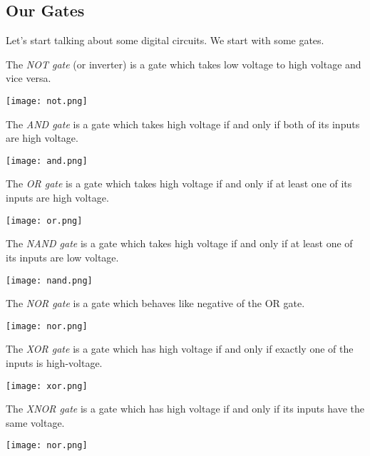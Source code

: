 \subsection{Our Gates}
Let's start talking about some digital circuits. We start with some gates.
\begin{definition}
	The \textit{NOT gate} (or inverter) is a gate which takes low voltage to high voltage and vice versa.
	\begin{center}
		\texttt{[image: not.png]}
	\end{center}
\end{definition}
\begin{definition}
	The \textit{AND gate} is a gate which takes high voltage if and only if both of its inputs are high voltage.
	\begin{center}
		\texttt{[image: and.png]}
	\end{center}
\end{definition}
\begin{definition}[OR gate]
	The \textit{OR gate} is a gate which takes high voltage if and only if at least one of its inputs are high voltage.
	\begin{center}
		\texttt{[image: or.png]}
	\end{center}
\end{definition}
\begin{definition}
	The \textit{NAND gate} is a gate which takes high voltage if and only if at least one of its inputs are low voltage.
	\begin{center}
		\texttt{[image: nand.png]}
	\end{center}
\end{definition}
\begin{definition}
	The \textit{NOR gate} is a gate which behaves like negative of the OR gate.
	\begin{center}
		\texttt{[image: nor.png]}
	\end{center}
\end{definition}
\begin{definition}
	The \textit{XOR gate} is a gate which has high voltage if and only if exactly one of the inputs is high-voltage.
	\begin{center}
		\texttt{[image: xor.png]}
	\end{center}
\end{definition}
\begin{definition}
	The \textit{XNOR gate} is a gate which has high voltage if and only if its inputs have the same voltage.
	\begin{center}
		\texttt{[image: nor.png]}
	\end{center}
\end{definition}


